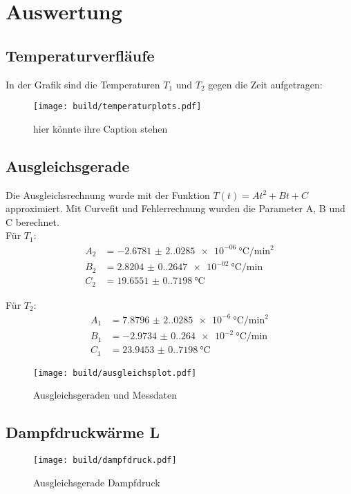 \section{Auswertung}
\label{sec:Auswertung}


\subsection{Temperaturverfläufe}
In der Grafik sind die Temperaturen $T_1$ und $T_2$ gegen die Zeit aufgetragen:
\begin{figure}
  \centering
  \texttt{[image: build/temperaturplots.pdf]}
  \caption{hier könnte ihre Caption stehen}
\end{figure}

\subsection{Ausgleichsgerade}
Die Ausgleichsrechnung wurde mit der Funktion $T(t) = A t^2 + B t + C$ approximiert. Mit Curvefit und Fehlerrechnung 
wurden die Parameter A, B und C berechnet.\\
Für $T_1$:
\begin{align*}
  A_2 &= \SI{-2.6781(2.0285)e-06}{\degreeCelsius\per\square\minute}\\
  B_2 &= \SI{2.8204(0.2647)e-02}{\degreeCelsius\per\minute}\\
  C_2 &= \SI{19.6551(0.7198)}{\degreeCelsius}
\end{align*}

Für $T_2$:
\begin{align*}
  A_1 &= \SI{7.8796(2.0285)e-6}{\degreeCelsius\per\square\minute}\\
  B_1 &= \SI{-2.9734(0.264)e-2}{\degreeCelsius\per\minute}\\
  C_1 &= \SI{23.9453(0.7198)}{\degreeCelsius}
\end{align*}

\begin{figure}
  \centering
  \texttt{[image: build/ausgleichsplot.pdf]}
  \caption{Ausgleichsgeraden und Messdaten}
\end{figure}

\subsection{Dampfdruckwärme L}

\begin{figure}
  \centering
  \texttt{[image: build/dampfdruck.pdf]}
  \caption{Ausgleichsgerade Dampfdruck}
\end{figure}

